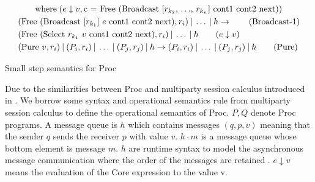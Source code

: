 \begin{table}[ht]
\begin{align*}
    & \qquad \text{where} \;(e \downarrow v, \text{c = Free (Broadcast [$r_{k_2}$, $\ldots$, $r_{k_n}$] cont1 cont2 next)}) \notag\\ 
    &(\text{Free (Broadcast [$r_{k_1}$] $e$ cont1 cont2 next)}, r_i) \: | \: \ldots \: | \: h \rightarrow  \tag{Broadcast-1}\\ 
    &(\text{Free (Select $r_{k_1}$ $v$ cont1 cont2 next)}, r_i) \: | \: \ldots \: | \: h \qquad (e \downarrow v) \notag\\ 
    &(\text{Pure $v$}, r_i) \: | \: (P_i, r_i) \: | \: \ldots \: | \: (P_j, r_j) \: | \: h \rightarrow (P_i, r_i) \: | \: \ldots \: | \: (P_j, r_j) \: | \: h \tag{Pure}\\ 
\end{align*}
\caption{Small step semantics for Proc}
\label{spar:sstep}
\end{table}
Due to the similarities between Proc and multiparty session calculus introduced in \cite{coppoGentleIntroductionMultiparty2015}. We borrow some syntax and operational semantics rule from multiparty session calculus to define the operational semantics of Proc. $P, Q$ denote Proc programs. A message queue is $h$ which contains messages $(q, p, v)$ meaning that the sender $q$ sends the receiver $p$ with value $v$. $h \cdot m$ is a message queue whose bottom element is message $m$. $h$ are runtime syntax to model the asynchronous message communication where the order of the messages are retained \cite{coppoGentleIntroductionMultiparty2015}. $e \downarrow v$ means the evaluation of the Core expression to the value v.

